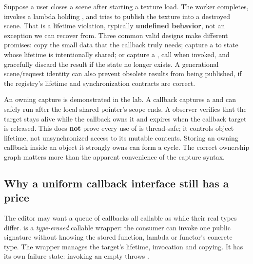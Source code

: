 Suppose a user closes a scene after starting a texture load. The worker completes, invokes a lambda holding \BookInlineCode{{[}\&scene{]}}, and tries to publish the texture into a destroyed scene. That is a lifetime violation, typically \textbf{undefined behavior}, not an exception we can recover from. Three common valid designs make different promises: copy the small data that the callback truly needs; capture a  to state whose lifetime is intentionally shared; or capture a , call  when invoked, and gracefully discard the result if the state no longer exists. A generational scene/request identity can also prevent obsolete results from being published, if the registry's lifetime and synchronization contracts are correct.

An owning capture is demonstrated in the lab. A callback captures a  and can safely run after the local shared pointer's scope ends. A  observer verifies that the target stays alive while the callback owns it and expires when the callback target is released. This does \textbf{not} prove every use of  is thread-safe; it controls object lifetime, not unsynchronized access to its mutable contents. Storing an owning callback inside an object it strongly owns can form a cycle. The correct ownership graph matters more than the apparent convenience of the capture syntax.

\subsection{Why a uniform callback interface still has a price}\label{01-foundations-i-ch004-why-a-uniform-callback-interface-still-has-a-price}

\hypertarget{01-foundations-i-ch004-why-a-uniform-callback-interface-still-has-a-price}{}

The editor may want a queue of callbacks all callable as  while their real types differ.  is a \emph{type-erased} callable wrapper: the consumer can invoke one public signature without knowing the stored function, lambda or functor's concrete type. The wrapper manages the target's lifetime, invocation and copying. It has its own failure state: invoking an empty  throws .

